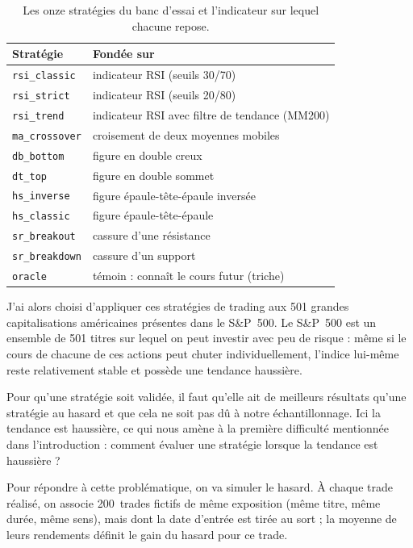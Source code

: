 \begin{table}[H]
\centering
\caption{Les onze stratégies du banc d'essai et l'indicateur sur lequel chacune repose.}
\label{tab:strategies}
\renewcommand{\arraystretch}{1.25}
\small
\begin{tabular}{@{}ll@{}}
\toprule
Stratégie & Fondée sur \\
\midrule
\texttt{rsi\_classic}  & indicateur RSI (seuils 30/70) \\
\texttt{rsi\_strict}   & indicateur RSI (seuils 20/80) \\
\texttt{rsi\_trend}    & indicateur RSI avec filtre de tendance (MM200) \\
\texttt{ma\_crossover} & croisement de deux moyennes mobiles \\
\texttt{db\_bottom}    & figure en double creux \\
\texttt{dt\_top}       & figure en double sommet \\
\texttt{hs\_inverse}   & figure épaule-tête-épaule inversée \\
\texttt{hs\_classic}   & figure épaule-tête-épaule \\
\texttt{sr\_breakout}  & cassure d'une résistance \\
\texttt{sr\_breakdown} & cassure d'un support \\
\midrule
\texttt{oracle}        & témoin : connaît le cours futur (triche) \\
\bottomrule
\end{tabular}
\end{table}

J'ai alors choisi d'appliquer ces stratégies de trading aux
501 grandes capitalisations américaines présentes dans le S\&P~500.
Le S\&P~500 est un ensemble de 501 titres sur lequel on peut investir avec peu de
risque : même si le cours de chacune de ces actions peut chuter
individuellement, l'indice lui-même reste relativement stable et possède une tendance
haussière.

Pour qu'une stratégie soit validée, il faut qu'elle ait de meilleurs
résultats qu'une stratégie au hasard et que cela ne soit pas dû à
notre échantillonnage.
Ici la tendance est haussière, ce qui nous amène à la première
difficulté mentionnée dans l'introduction : comment évaluer une 
stratégie lorsque la tendance est haussière ?

Pour répondre à cette problématique, on va simuler le hasard.
À chaque trade réalisé, on associe 200~trades fictifs de même exposition
(même titre, même durée, même sens), mais dont la date
d'entrée est tirée au sort ; la moyenne de leurs rendements définit le
gain du hasard pour ce trade.

